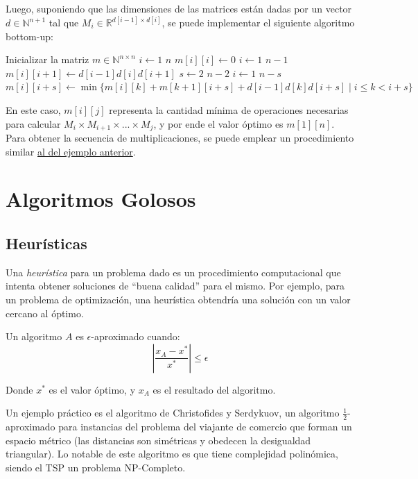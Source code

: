 \documentclass[a4paper]{report}
\newcommand{\N}{\mathbb{N}}
\newcommand{\R}{\mathbb{R}}
\begin{document}
Luego, suponiendo que las dimensiones de las matrices están dadas por un vector $d \in \N^{n+1}$ tal que $M_i \in \R^{d[i-1] \times d[i]}$, se puede implementar el siguiente algoritmo bottom-up:

\begin{codebox}
    \li Inicializar la matriz $m \in \N^{n \times n}$
    \li \For $i \gets 1$ \To $n$ \Do
    \li $m[i][i] \gets 0$
    \End
    \li \For $i \gets 1$ \To $n - 1$ \Do
    \li $m[i][i + 1] \gets d[i - 1]d[i]d[i + 1]$
    \End
    \li \For $s \gets 2$ \To $n - 2$ \Do
    \li \For $i \gets 1$ \To $n - s$ \Do
    \li $m[i][i + s] \gets \min{\{m[i][k] + m[k+1][i+s] + d[i-1]d[k]d[i+s] \mid i \leq k < i + s\}}$
    \End
    \End
\end{codebox}

En este caso, $m[i][j]$ representa la cantidad mínima de operaciones necesarias para calcular $M_i \times M_{i+1} \times ... \times M_j$, y por ende el valor óptimo es $m[1][n]$. Para obtener la secuencia de multiplicaciones, se puede emplear un procedimiento similar \hyperref[reconstruccion-solucion]{al del ejemplo anterior}.


\section{Algoritmos Golosos}

\subsection{Heurísticas}

Una \textit{heurística} para un problema dado es un procedimiento computacional que intenta obtener soluciones de ``buena calidad'' para el mismo. Por ejemplo, para un problema de optimización, una heurística obtendría una solución con un valor cercano al óptimo.

Un algoritmo $A$ es $\epsilon$-aproximado cuando:
$$\left|\frac{x_A - x^*}{x^*}\right| \leq \epsilon$$

Donde $x^*$ es el valor óptimo, y $x_A$ es el resultado del algoritmo.

Un ejemplo práctico es el algoritmo de Christofides y Serdykuov, un algoritmo $\frac{1}{2}$-aproximado para instancias del problema del viajante de comercio que forman un espacio métrico (las distancias son simétricas y obedecen la desigualdad triangular). Lo notable de este algoritmo es que tiene complejidad polinómica, siendo el TSP un problema NP-Completo.
\end{document}
